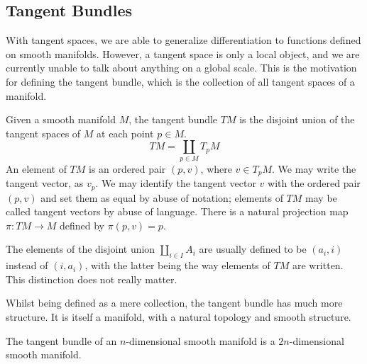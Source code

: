 \documentclass[a4paper,12pt]{article}
\begin{document}
\subsection{Tangent Bundles}\label{subsec:manifolds:tangent_bundles}

With tangent spaces, we are able to generalize differentiation to functions defined on smooth manifolds.
However, a tangent space is only a local object, and we are currently unable to talk about anything on a global scale.
This is the motivation for defining the tangent bundle, which is the collection of all tangent spaces of a manifold.
\begin{definition}\label{def:tangent_bundle}
    Given a smooth manifold $M$, the tangent bundle $TM$ is the disjoint union of the tangent spaces of $M$ at each point $p \in M$.
    \begin{equation}
        TM = \coprod_{p \in M} T_p M
    \end{equation}
    An element of $TM$ is an ordered pair $(p, v)$, where $v \in T_p M$.
    We may write the tangent vector, as $v_p$.
    We may identify the tangent vector $v$ with the ordered pair $(p, v)$ and set them as equal by abuse of notation; elements of $TM$ may be called tangent vectors by abuse of language.
    There is a natural projection map $\pi \colon TM \to M$ defined by $\pi(p, v) = p$.
\end{definition}
\begin{remark}
    The elements of the disjoint union $\coprod_{i \in I} A_i$ are usually defined to be $(a_i, i)$ instead of $(i, a_i)$, with the latter being the way elements of $TM$ are written.
    This distinction does not really matter.
\end{remark}
Whilst being defined as a mere collection, the tangent bundle has much more structure.
It is itself a manifold, with a natural topology and smooth structure.
\begin{proposition}\label{prop:tangent_bundle_is_manifold}
    The tangent bundle of an $n$-dimensional smooth manifold is a $2n$-dimensional smooth manifold.
\end{proposition}
\end{document}
